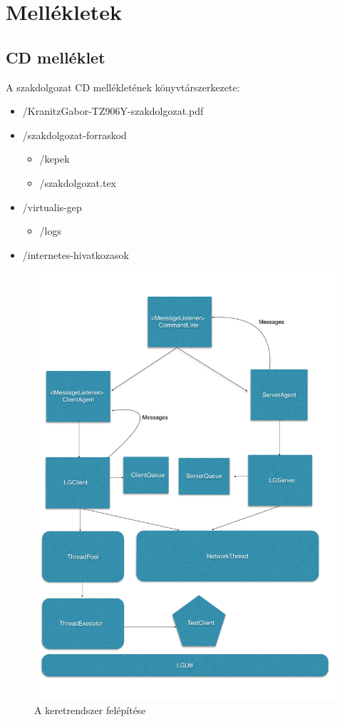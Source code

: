 \documentclass[a4paper,12pt,oneside]{report}
\begin{document}
\section{Mellékletek}

\subsection{CD melléklet}
A szakdolgozat CD mellékletének könyvtárszerkezete:

\begin{itemize}
    \item[] /KranitzGabor-TZ906Y-szakdolgozat.pdf
    \item[] /szakdolgozat-forraskod
    \begin{itemize}
        \item[] /kepek
        \item[] /szakdolgozat.tex
    \end{itemize}
    
    \item[] /virtualis-gep
    \begin{itemize}
        \item[] /logs
    \end{itemize}
    
    \item[] /internetes-hivatkozasok

\end{itemize}

\begin{figure}[h]
  \includegraphics[width=1\textwidth]{load_generator.png}
  \caption{A keretrendszer felépítése }
  \label{fig:load_generator}
\end{figure}
\end{document}
